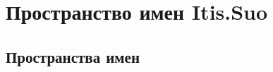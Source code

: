 \hypertarget{namespace_itis_1_1_suo}{}\section{Пространство имен Itis.\+Suo}
\label{namespace_itis_1_1_suo}
\subsection*{Пространства имен}
\begin{DoxyCompactItemize}
\end{DoxyCompactItemize}
